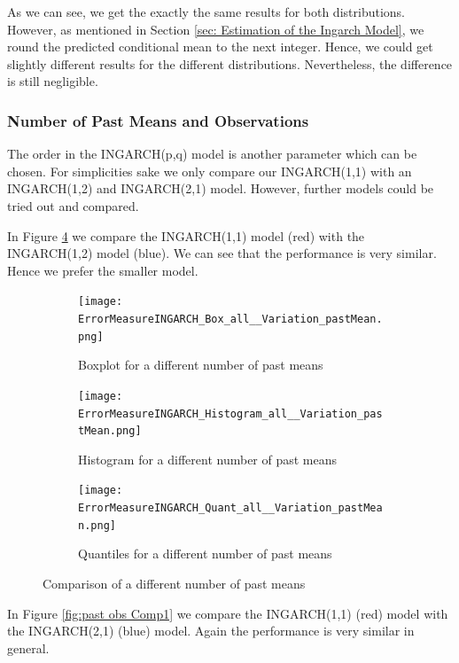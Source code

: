 As we can see, we get the exactly the same results for both distributions. However, as mentioned in Section \ref{sec: Estimation of the Ingarch Model}, we round the predicted conditional mean to the next integer. Hence, we could get slightly different results for the different distributions. Nevertheless, the difference is still negligible. %


\subsubsection{Number of Past Means and Observations}
\label{sec: Number of Past Means and Observations}

The order in the INGARCH(p,q) model is another parameter which can be chosen. For simplicities sake we only compare our INGARCH(1,1) with an INGARCH(1,2) and INGARCH(2,1) model. However, further models could be tried out and compared. 

In Figure \ref{fig:past means Comp1} we compare the INGARCH(1,1) model (red) with the INGARCH(1,2) model (blue). We can see that the performance is very similar. Hence we prefer the smaller model. 
\begin{figure}[htb!]
\centering
\begin{subfigure}[b]{0.45\textwidth}
\texttt{[image: ErrorMeasureINGARCH\_Box\_all\_\_Variation\_pastMean.png]}
\caption{Boxplot for a different number of past means}
\label{fig:past means Box}
\end{subfigure}
\hfill
\begin{subfigure}[b]{0.45\textwidth}
\texttt{[image: ErrorMeasureINGARCH\_Histogram\_all\_\_Variation\_pastMean.png]}
\caption{Histogram for a different number of past means}
\label{fig:past means Hist}
\end{subfigure}
\hfill
\begin{subfigure}[b]{0.8\textwidth}
\texttt{[image: ErrorMeasureINGARCH\_Quant\_all\_\_Variation\_pastMean.png]}
\caption{Quantiles for a different number of past means}
\label{fig:past means Quant}
\end{subfigure}
\caption{Comparison of a different number of past means}
\label{fig:past means Comp1}
\end{figure}


In Figure \ref{fig:past obs Comp1} we compare the INGARCH(1,1) (red) model with the INGARCH(2,1) (blue) model. Again the performance is very similar in general. 


